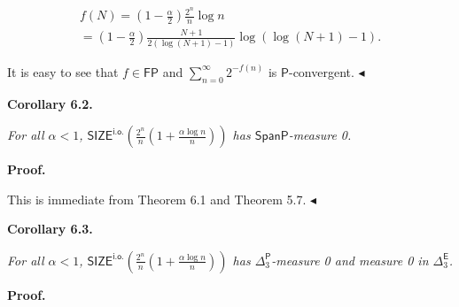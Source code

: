 \documentclass[10pt,a4paper]{article}
\begin{document}
\[\begin{gathered}
\displaystyle f(N) \displaystyle= \displaystyle\left(1-\frac{\alpha}{2}\right)\frac{2^{n}}{n}\log n \\
\displaystyle= \displaystyle\left(1-\frac{\alpha}{2}\right)\frac{N+1}{2(\log\left(N+1\right)-1)}\log\left(\log\left(N+1\right)-1\right).
\end{gathered}\]


It is easy to see that $f\in\mathsf{FP}$ and $\sum_{n=0}^{\infty}2^{-f(n)}$ is $\mathsf{P}$-convergent.
$\blacktriangleleft$\par





\par\medskip\noindent\textbf{
\textbf{Corollary 6.2}\textbf{.}
}\par



\emph{For all $\alpha<1$,
$\mathsf{SIZE}^{\mathsf{i.o.}}\!\!\left(\frac{2^{n}}{n}\left(1+\frac{\alpha\log
n}{n}\right)\right)$
has $\mathsf{SpanP}$-measure 0.}\par







\par\medskip\noindent\textbf{Proof.}\par




This is immediate from Theorem 6.1 and Theorem 5.7.
$\blacktriangleleft$\par





\par\medskip\noindent\textbf{
\textbf{Corollary 6.3}\textbf{.}
}\par



\emph{For all $\alpha<1$,
$\mathsf{SIZE}^{\mathsf{i.o.}}\!\!\left(\frac{2^{n}}{n}\left(1+\frac{\alpha\log
n}{n}\right)\right)$
has ${\Delta^{\mathsf{P}}_{3}}$-measure 0 and measure 0 in $\Delta^{\mathsf{E}}_{3}$.}\par







\par\medskip\noindent\textbf{Proof.}\par
\end{document}
